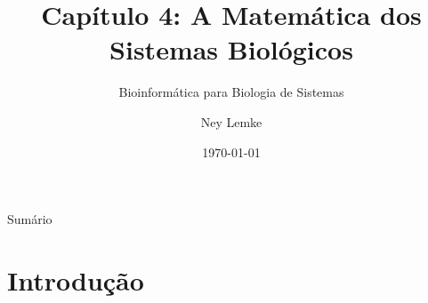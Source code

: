 


\title[Cap. 4: Matemática de Sistemas Biológicos]{Capítulo 4: A Matemática dos Sistemas Biológicos}
\subtitle{Bioinformática para Biologia de Sistemas}
\author{Ney Lemke}
\date{\today}



\begin{frame}[allowframebreaks]
\titlepage
\end{frame}

\begin{frame}[allowframebreaks]{Sumário}
\tableofcontents
\end{frame}

\section{Introdução}

